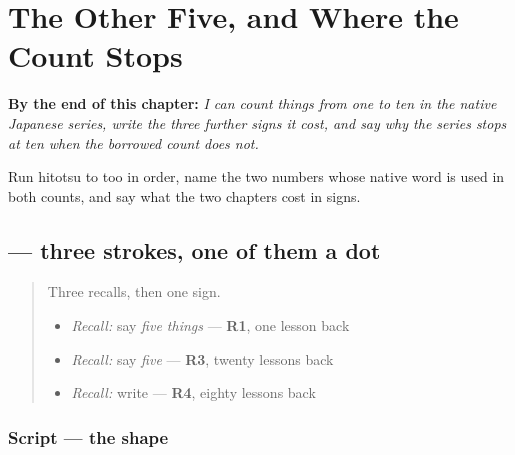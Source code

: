 
\chapter{The Other Five, and Where the Count Stops}
\label{ch:ja-native-count-six-to-ten}

\begin{chapteropening}
\textbf{By the end of this chapter:} \emph{I can count things from one to ten in the native Japanese series, write the three further signs it cost, and say why the series stops at ten when the borrowed count does not.}

Run hitotsu to too in order, name the two numbers whose native word is used in both counts, and say what the two chapters cost in signs.
\end{chapteropening}

\section[\texorpdfstring{\ja{む} (mu)}{む (mu)}]{ — three strokes, one of them a dot}

\label{lesson:JA-W17-mu}



\begin{quote}
Three recalls, then one sign.

\begin{itemize}
\raggedright
  \item \emph{Recall:} say \emph{five things} — \textbf{R1}, one lesson back
  \item \emph{Recall:} say \emph{five} — \textbf{R3}, twenty lessons back
  \item \emph{Recall:} write \textbf{} — \textbf{R4}, eighty lessons back
\end{itemize}
\end{quote}

\subsection*{Script — the shape}

